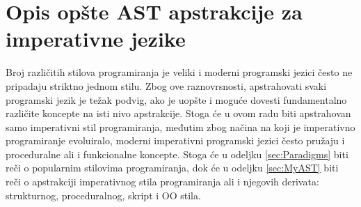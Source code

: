 \chapter{Opis opšte AST apstrakcije za imperativne jezike}
\label{chp:MyAST}

Broj različitih stilova programiranja je veliki i moderni programski jezici često ne pripadaju striktno jednom stilu. Zbog ove raznovrsnosti, apstrahovati svaki programski jezik je težak podvig, ako je uopšte i moguće dovesti fundamentalno različite koncepte na isti nivo apstrakcije. Stoga će u ovom radu biti apstrahovan samo imperativni stil programiranja, međutim zbog načina na koji je imperativno programiranje evoluiralo, moderni imperativni programski jezici često pružaju i proceduralne ali i funkcionalne koncepte. Stoga će u odeljku \ref{sec:Paradigms} biti reči o popularnim stilovima programiranja, dok će u odeljku \ref{sec:MyAST} biti reči o apstrakciji imperativnog stila programiranja ali i njegovih derivata: strukturnog, proceduralnog, skript i OO stila.



